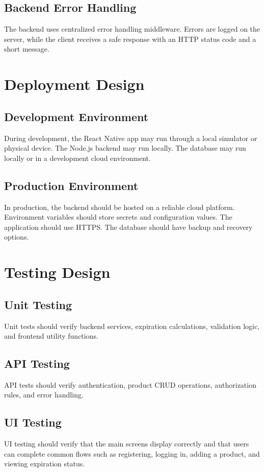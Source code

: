 \documentclass[12pt]{article}
\begin{document}
\subsection{Backend Error Handling}
The backend uses centralized error handling middleware. Errors are logged on the server, while the client receives a safe response with an HTTP status code and a short message.

\section{Deployment Design}

\subsection{Development Environment}
During development, the React Native app may run through a local simulator or physical device. The Node.js backend may run locally. The database may run locally or in a development cloud environment.

\subsection{Production Environment}
In production, the backend should be hosted on a reliable cloud platform. Environment variables should store secrets and configuration values. The application should use HTTPS. The database should have backup and recovery options.

\section{Testing Design}

\subsection{Unit Testing}
Unit tests should verify backend services, expiration calculations, validation logic, and frontend utility functions.

\subsection{API Testing}
API tests should verify authentication, product CRUD operations, authorization rules, and error handling.

\subsection{UI Testing}
UI testing should verify that the main screens display correctly and that users can complete common flows such as registering, logging in, adding a product, and viewing expiration status.
\end{document}

